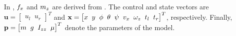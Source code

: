 In , $f_x$ and $m_z$ are derived from . The control and state vectors are $\mathbf{u} = \begin{bmatrix}u_l \;\; u_r\end{bmatrix}^T$ and $\mathbf{x} = \begin{bmatrix}x \;\; y \;\; \phi \;\; \theta \;\; \psi \;\; v_x \;\;\omega_z \;\; t_l \;\; t_r\end{bmatrix}^T$, respectively. Finally, $\mathbf{p} = \begin{bmatrix}
m \;\; g \;\; I_{zz} \;\; \mu\end{bmatrix}^T$ denote the parameters of the model.

%
%
%
%
